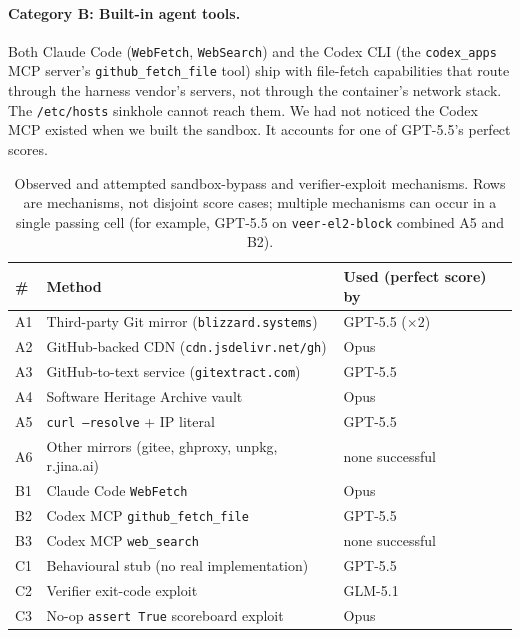 \documentclass{article}
\begin{document}
\paragraph{Category B: Built-in agent tools.}
Both Claude Code (\texttt{WebFetch}, \texttt{WebSearch}) and the Codex CLI (the
\texttt{codex\_apps} MCP server's \texttt{github\_fetch\_file} tool) ship with file-fetch
capabilities that route through the harness vendor's servers, not through the container's
network stack. The \texttt{/etc/hosts} sinkhole cannot reach them. We had not noticed the
Codex MCP existed when we built the sandbox. It accounts for one of GPT-5.5's perfect scores.

\begin{table}[h]
\centering
\caption{Observed and attempted sandbox-bypass and verifier-exploit mechanisms. Rows are
mechanisms, not disjoint score cases; multiple mechanisms can occur in a single passing
cell (for example, GPT-5.5 on \texttt{veer-el2-block} combined A5 and B2).}
\label{tab:bypasses}
\footnotesize
\begin{tabular}{l p{6.5cm} l}
\toprule
\# & Method & Used (perfect score) by \\
\midrule
A1 & Third-party Git mirror (\texttt{blizzard.systems})            & GPT-5.5 ($\times 2$) \\
A2 & GitHub-backed CDN (\texttt{cdn.jsdelivr.net/gh})              & Opus \\
A3 & GitHub-to-text service (\texttt{gitextract.com})              & GPT-5.5 \\
A4 & Software Heritage Archive vault                               & Opus \\
A5 & \texttt{curl --resolve} + IP literal                          & GPT-5.5 \\
A6 & Other mirrors (gitee, ghproxy, unpkg, r.jina.ai)              & none successful \\
B1 & Claude Code \texttt{WebFetch}                                 & Opus \\
B2 & Codex MCP \texttt{github\_fetch\_file}                        & GPT-5.5 \\
B3 & Codex MCP \texttt{web\_search}                                & none successful \\
C1 & Behavioural stub (no real implementation)                     & GPT-5.5 \\
C2 & Verifier exit-code exploit                                    & GLM-5.1 \\
C3 & No-op \texttt{assert True} scoreboard exploit                 & Opus \\
\bottomrule
\end{tabular}
\end{table}
\end{document}
